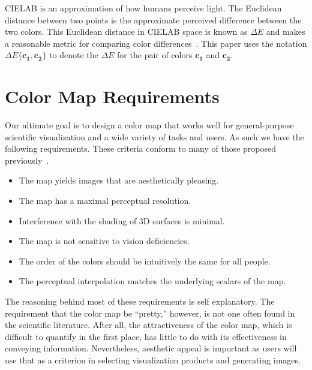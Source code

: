 \documentclass{llncs}
\newcommand{\lcite}[1]{~\cite{#1}}
\newcommand{\Lab}{CIELAB\xspace}
\newcommand{\DeltaE}{\ensuremath{\Delta{}E}\xspace}
\newcommand*{\cvec}[1]{\mathbf{#1}}
\begin{document}
\Lab is an approximation of how humans perceive light.  The Euclidean
distance between two points is the approximate perceived difference between
the two colors.  This Euclidean distance in \Lab space is known as \DeltaE
and makes a reasonable metric for comparing color differences\lcite{Wyszecki82}.
This paper uses the notation $\DeltaE\{\cvec{c_1},\cvec{c_2}\}$ to denote
the \DeltaE for the pair of colors $\cvec{c_1}$ and $\cvec{c_2}$.


\section{Color Map Requirements}
\label{sec:ColorMapRequirements}

Our ultimate goal is to design a color map that works well for
general-purpose scientific visualization and a wide
variety of tasks and users.  As such we have the following requirements.
These criteria conform to many of those proposed
previously\lcite{Fortner97,Levkowitz92,Light04}.

\begin{itemize}
\item The map yields images that are aesthetically pleasing.
\item The map has a maximal perceptual resolution.
\item Interference with the shading of 3D surfaces is minimal.
\item The map is not sensitive to vision deficiencies.
\item The order of the colors should be intuitively the same for all
  people.
\item The perceptual interpolation matches the underlying scalars of the map.
\end{itemize}

The reasoning behind most of these requirements is self explanatory.  The
requirement that the color map be ``pretty,'' however, is not one often
found in the scientific literature.  After all, the attractiveness of the
color map, which is difficult to quantify in the first place, has little to
do with its effectiveness in conveying information.  Nevertheless, aesthetic
appeal is important as users will use that as a criterion in selecting
visualization products and generating images.

\end{document}
